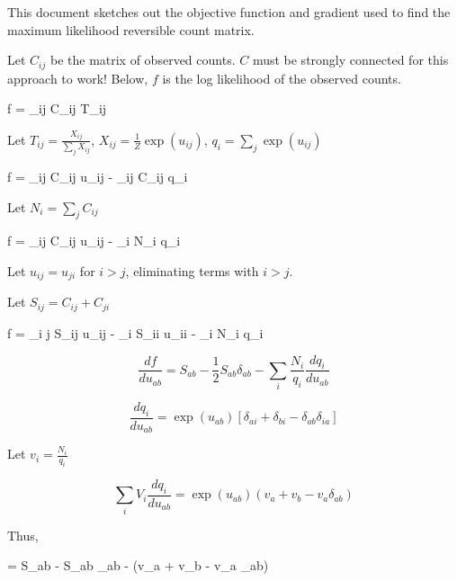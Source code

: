 \documentclass[12pt]{article}
\let\[\equation
\let\]\endequation
\begin{document}
This document sketches out the objective function and gradient used to find the maximum likelihood reversible count matrix.  

Let $C_{ij}$ be the matrix of observed counts.  $C$ must be strongly connected for this approach to work!  Below, $f$ is the log likelihood of the observed counts.

\[
f = \sum_{ij} C_{ij} \log T_{ij}
\]



Let $T_{ij} = \frac{X_{ij}}{\sum_j X_{ij}}$, $X_{ij} = \frac{1}{Z} \exp(u_{ij})$, $q_i = \sum_j \exp(u_{ij})$

\[f = \sum_{ij} C_{ij} u_{ij} - \sum_{ij} C_{ij} \log q_i\]

Let $N_i = \sum_j C_{ij}$

\[f = \sum_{ij} C_{ij} u_{ij} - \sum_{i} N_i \log q_i\]

Let $u_{ij} = u_{ji}$ for $i > j$, eliminating terms with $i>j$.

Let $S_{ij} = C_{ij} + C_{ji}$

\[f = \sum_{i \le j} S_{ij} u_{ij} -  \sum_i S_{ii} u_{ii} - \sum_i N_i \log q_i\]


$$\frac{df}{du_{ab}} = S_{ab}  - \frac{1}{2} S_{ab} \delta_{ab} - \sum_i \frac{N_i}{q_i} \frac{dq_i}{du_{ab}}$$

$$\frac{dq_i}{du_{ab}} = \exp(u_{ab}) [\delta_{ai} + \delta_{bi} - \delta_{ab} \delta_{ia}]$$

Let $v_i = \frac{N_i}{q_i}$

$$ \sum_i V_i \frac{dq_i}{du_{ab}} = \exp(u_{ab}) (v_a + v_b - v_a \delta_{ab})$$ 

Thus,

\[ = S_{ab}  -  S_{ab} \delta_{ab} - (v_a + v_b - v_a \delta_{ab})\]
\end{document}
